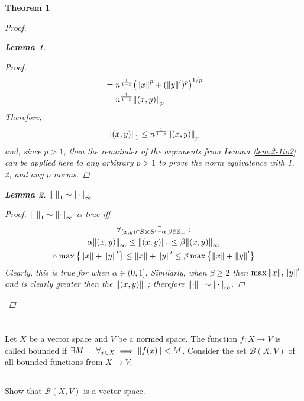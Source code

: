 \documentclass[]{article}
\newcommand{\R}{\mathbb{R}}
\newcommand{\st}{\ : \ }
\newtheorem{theorem}{Theorem}
\newtheorem{lemma}{Lemma}
\begin{document}
\begin{theorem}
\begin{proof}
\begin{lemma}
\begin{proof}
\begin{align*}
                        &= n^{\frac{1}{1-p}} \qty(\norm{x}^p + (\norm{y}')^p)^{1/p}\\
                        &= n^{\frac{1}{1-p}} \norm{(x,y)}_p
                \end{align*}
                Therefore,
                \[
                    \norm{(x,y)}_1 \leq n^{\frac{1}{1-p}} \norm{(x,y)}_p
                \]
                and, since $p > 1$, then the remainder of the arguments from Lemma \ref{lem:2-1to2} can be applied here to any arbitrary $p > 1$ to prove the norm equivalence with 1, 2, and any $p$ norms.
            \end{proof}
        \end{lemma}
        \begin{lemma}\label{lem:2-1toInfty}
            $\norm{\cdot}_1 \sim \norm{\cdot}_\infty$
            \begin{proof}
                $\norm{\cdot}_1 \sim \norm{\cdot}_\infty$ is true iff
                \begin{multline*} 
                    \forall_{(x,y) \in S \cross S'} \exists_{\alpha,\beta \in \R_+} :\\
                    \alpha \norm{(x,y)}_\infty \leq \norm{(x,y)}_1 \leq \beta \norm{(x,y)}_\infty\\
                    \alpha \max\qty{\norm{x} + \norm{y}'} \leq \norm{x} + \norm{y}' \leq \beta \max\qty{\norm{x} + \norm{y}'}\\
                \end{multline*}
                Clearly, this is true for when $\alpha \in (0,1]$. Similarly, when $\beta \geq 2$ then $\max{\norm{x},\norm{y}'}$ and is clearly greater then the $\norm{(x,y)}_1$; therefore $\norm{\cdot}_1 \sim \norm{\cdot}_\infty$.
            \end{proof}
        \end{lemma}
    \end{proof}
\end{theorem}

\newpage
\section{}
Let $X$ be a vector space and $V$ be a normed space. 
The function $f : X \to V$ is called bounded if $\exists M \st \forall_{x\in X} \implies \norm{f(x)} < M$. 
Consider the set $\mathcal{B}(X,V)$ of all bounded functions from $X \to V$. 

\subsection{}
Show that $\mathcal{B}(X,V)$ is a vector space.
\end{document}
